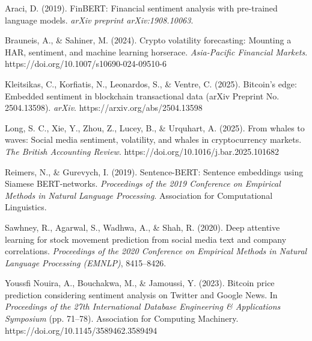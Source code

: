 \documentclass[11pt,twocolumn]{article}
\begin{document}

\begin{thebibliography}{00}
Araci, D. (2019). FinBERT: Financial sentiment analysis with pre-trained language models. \textit{arXiv preprint arXiv:1908.10063}.

Brauneis, A., \& Sahiner, M. (2024). Crypto volatility forecasting: Mounting a HAR, sentiment, and machine learning horserace. \textit{Asia-Pacific Financial Markets}. https://doi.org/10.1007/s10690-024-09510-6


Kleitsikas, C., Korfiatis, N., Leonardos, S., \& Ventre, C. (2025). Bitcoin's edge: Embedded sentiment in blockchain transactional data (arXiv Preprint No. 2504.13598). \textit{arXiv}. https://arxiv.org/abs/2504.13598

Long, S. C., Xie, Y., Zhou, Z., Lucey, B., \& Urquhart, A. (2025). From whales to waves: Social media sentiment, volatility, and whales in cryptocurrency markets. \textit{The British Accounting Review}. https://doi.org/10.1016/j.bar.2025.101682

Reimers, N., \& Gurevych, I. (2019). Sentence-BERT: Sentence embeddings using Siamese BERT-networks. \textit{Proceedings of the 2019 Conference on Empirical Methods in Natural Language Processing}. Association for Computational Linguistics.

Sawhney, R., Agarwal, S., Wadhwa, A., \& Shah, R. (2020). Deep attentive learning for stock movement prediction from social media text and company correlations. \textit{Proceedings of the 2020 Conference on Empirical Methods in Natural Language Processing (EMNLP)}, 8415–8426.

Youssfi Nouira, A., Bouchakwa, M., \& Jamoussi, Y. (2023). Bitcoin price prediction considering sentiment analysis on Twitter and Google News. In \textit{Proceedings of the 27th International Database Engineering \& Applications Symposium} (pp. 71–78). Association for Computing Machinery. https://doi.org/10.1145/3589462.3589494
\end{thebibliography}
\end{document}

